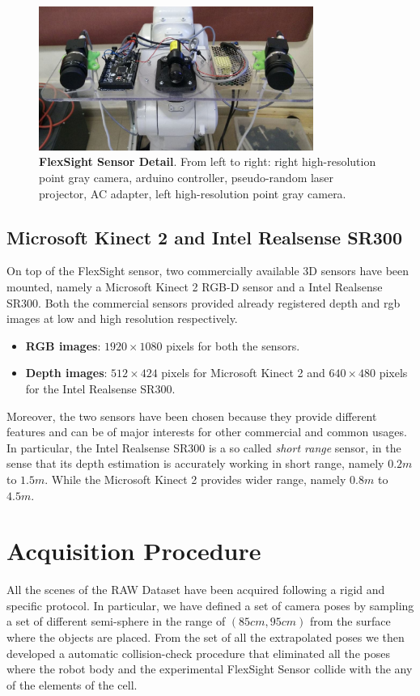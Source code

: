 \begin{figure}
    \centering
    \includegraphics[width=0.8\textwidth]{figures/3_raw_dataset/fs_sensor_0}
    \caption{\textbf{FlexSight Sensor Detail}. From left to right: right high-resolution point gray camera, arduino controller, pseudo-random laser projector, AC adapter, left high-resolution point gray camera.}
    \label{fig:fs_sensor_0}
\end{figure}

\subsection{Microsoft Kinect 2 and Intel Realsense SR300}\label{subsec:raw_setup_kin&realsense}
On top of the FlexSight sensor, two commercially available 3D sensors have been mounted, namely a Microsoft Kinect 2 RGB-D sensor and a Intel Realsense SR300. Both the commercial sensors provided already registered depth and rgb images at low and high resolution respectively.

\begin{itemize}
	\item \textbf{RGB images}: $1920\times1080$ pixels for both the sensors.
	\item \textbf{Depth images}: $512\times424$ pixels for Microsoft Kinect 2 and $640\times480$ pixels for the Intel Realsense SR300.
\end{itemize}

Moreover, the two sensors have been chosen because they provide different features and can be of major interests for other commercial and common usages. In particular, the Intel Realsense SR300 is a so called \emph{short range} sensor, in the sense that its depth estimation is accurately working in short range, namely $0.2m$ to $1.5m$. While the Microsoft Kinect 2 provides wider range, namely $0.8m$ to $4.5m$.

\section{Acquisition Procedure}\label{sec:raw_acquisition_procedure}
All the scenes of the RAW Dataset have been acquired following a rigid and specific protocol. In particular, we have defined a set of camera poses by sampling a set of different semi-sphere in the range of $(85cm, 95cm)$ from the surface where the objects are placed. From the set of all the extrapolated poses we then developed a automatic collision-check procedure that eliminated all the poses where the robot body and the experimental FlexSight Sensor collide with the any of the elements of the cell.

